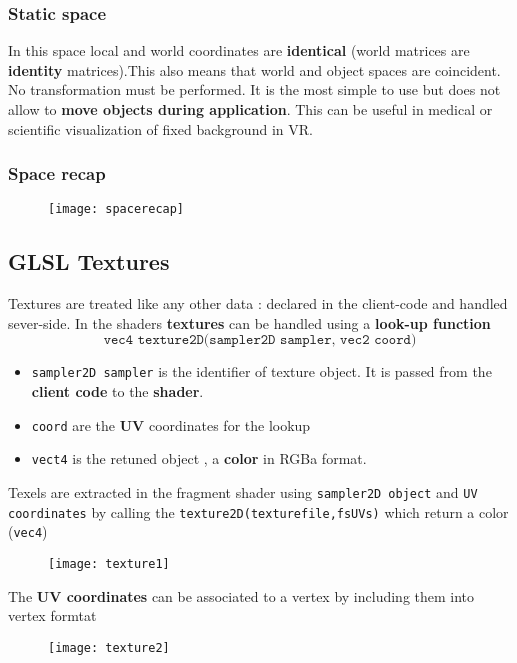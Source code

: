 \subsubsection{Static space}
In this space local and world coordinates are \textbf{identical} (world matrices are \textbf{identity} matrices).This also means that  world and object spaces are coincident. No transformation must be performed. It is the most simple to use but does not allow to \textbf{move objects during application}. This can be useful in medical or scientific visualization of fixed background in VR.

\subsubsection{Space recap}
\begin{figure}[H]
 \centering
 \texttt{[image: spacerecap]} 
\end{figure} 

\subsection{GLSL Textures}
Textures are treated like any other data : declared in the client-code and handled sever-side. In the shaders \textbf{textures } can be handled using a \textbf{look-up function} $$ \texttt{vec4 texture2D(sampler2D sampler, vec2 coord)}$$
\begin{itemize}
\item \texttt{sampler2D sampler} is the identifier of texture object. It is passed from the \textbf{client code } to the \textbf{shader}.
\item \texttt{coord} are the \textbf{UV} coordinates for the lookup
\item \texttt{vect4} is the retuned object , a \textbf{color} in RGBa format.
\end{itemize}
Texels are extracted in the fragment shader using \texttt{sampler2D object} and \texttt{UV coordinates} by calling the \texttt{texture2D(texturefile,fsUVs)} which return a color (\texttt{vec4})
\begin{figure}[H]
 \centering
 \texttt{[image: texture1]} 
\end{figure} 
The \textbf{UV coordinates} can be associated to a vertex by including them into vertex formtat
\begin{figure}[H]
 \centering
 \texttt{[image: texture2]} 
\end{figure} 

